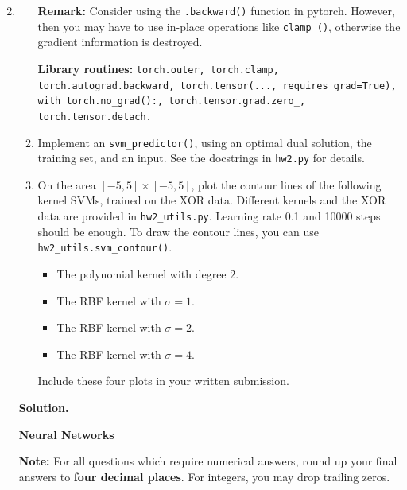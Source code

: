 \documentclass{article}
\theoremstyle{definition}
\theoremstyle{remark}
\newenvironment{Q}
{%
\clearpage
\item
}
{%
\phantom{s} %
\bigskip
\textbf{Solution.}
}
\newenvironment{Q_nosol}
{%
\clearpage
\item
}
{%
\phantom{s} %
\bigskip
}
\begin{document}
\begin{enumerate}[font={\Large\bfseries},left=0pt]
\begin{Q}
\begin{enumerate}
        \textbf{Remark:} Consider using the \texttt{.backward()} function in pytorch. However, then you may have to use in-place operations like \texttt{clamp\_()}, otherwise the gradient information is destroyed.
    
        \textbf{Library routines:} \texttt{torch.outer, torch.clamp, torch.autograd.backward, torch.tensor(..., requires\_grad=True), with torch.no\_grad():, torch.tensor.grad.zero\_, torch.tensor.detach.}

        \item Implement an \texttt{svm\_predictor()}, using an optimal dual solution, the training set, and an input. See the docstrings in \texttt{hw2.py} for details.

        \item On the area $[-5,5]\times[-5,5]$, plot the contour lines of the following kernel SVMs, trained on the XOR data. Different kernels and the XOR data are provided in \texttt{hw2\_utils.py}. Learning rate 0.1 and 10000 steps should be enough. To draw the contour lines, you can use \texttt{hw2\_utils.svm\_contour()}.
        \begin{itemize}
            \item The polynomial kernel with degree $2$.
            \item The RBF kernel with $\sigma=1$.
            \item The RBF kernel with $\sigma=2$.
            \item The RBF kernel with $\sigma=4$.
        \end{itemize}
        Include these four plots in your written submission.
    \end{enumerate} 
    \begin{tcolorbox}

    \end{tcolorbox}

    \end{Q}




    \begin{Q_nosol}
        \textbf{\Large Neural Networks}
        
\textbf{Note:} For all questions which require numerical answers, round up your final answers to \textbf{four decimal places}. For integers, you may drop trailing zeros.


\end{Q_nosol}
\end{enumerate}
\end{document}
